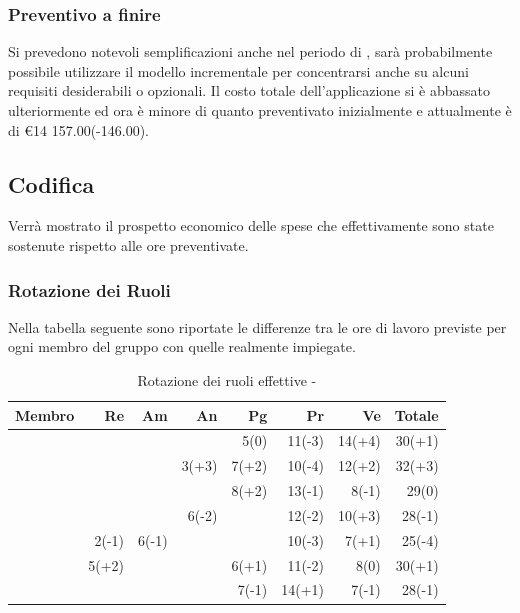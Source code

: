 \documentclass[12pt,a4paper]{article}
\begin{document}
\subsubsection{Preventivo a finire}
Si prevedono notevoli semplificazioni anche nel periodo di \FC{}, sarà probabilmente possibile utilizzare il modello incrementale per concentrarsi anche su alcuni requisiti desiderabili o opzionali. Il costo totale dell'applicazione si è abbassato ulteriormente ed ora è minore di quanto preventivato inizialmente e attualmente è di \euro{}14 157.00(-146.00).

\newpage

\subsection{Codifica}
Verrà mostrato il prospetto economico delle spese che effettivamente sono state sostenute rispetto alle ore preventivate.

\subsubsection{Rotazione dei Ruoli}
Nella tabella seguente sono riportate le differenze tra le ore di lavoro previste per ogni membro del gruppo con quelle realmente impiegate.

\begin{table}[H]
	\begin{center}
		\begin{tabular}{l r r r r r r r}
			\toprule
			\textbf{Membro}	&	\textbf{Re}	&	\textbf{Am}	& \textbf{An} & \textbf{Pg} & \textbf{Pr} & \textbf{Ve} & \textbf{Totale}\\
			\midrule
			\midrule
			\IB{} 	& 		& 		& 		& 5(0) 	& 11(-3) 	& 14(+4) 	& 30(+1) \\
			\midrule
			\AB{} 	& 		& 		& 3(+3) & 7(+2) & 10(-4) 	& 12(+2) 	& 32(+3) \\
			\midrule
			\NDC{} 	& 		& 		& 		& 8(+2) & 13(-1) 	& 8(-1) 	& 29(0) \\
			\midrule
			\TP{} 	& 		& 		& 6(-2) & 		& 12(-2) 	& 10(+3) 	& 28(-1) \\
			\midrule
			\WS{} 	& 2(-1) & 6(-1) & 		& 		& 10(-3) 	& 7(+1) 	& 25(-4) \\
			\midrule
			\AVE{} 	& 5(+2) 	& 		& 		& 6(+1) & 11(-2) 	& 8(0) 		& 30(+1) \\
			\midrule
			\AVI{} 	&&&& 7(-1) & 14(+1) 	& 7(-1) 	& 28(-1) \\
			\bottomrule
		\end{tabular}
		\caption{Rotazione dei ruoli effettive - \FC{}}
	\end{center}
\end{table}
\end{document}
